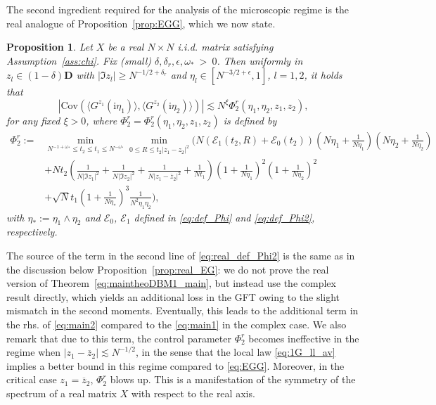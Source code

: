 \documentclass[10pt]{amsart}
\newtheorem{proposition}[theorem]{Proposition}
\numberwithin{equation}{section}
\newcommand{\ii}{\mathrm{i}}
\begin{document}
The second ingredient required for the analysis of the microscopic regime is the real analogue of Proposition~\ref{prop:EGG}, which we now state.

\begin{proposition}\label{prop:real_EGG} Let $X$ be a real $N\times N$ i.i.d. matrix satisfying Assumption~\ref{ass:chi}. Fix (small) $\delta,\delta_r,\epsilon, \omega_*~\!>~\!0$. Then uniformly in $z_l\in (1-\delta)\mathbf{D}$ with $|\Im z_l|\ge N^{-1/2+\delta_r}$ and $\eta_l\in[ N^{-3/2+\epsilon},1]$, $l=1,2$, it holds that
\begin{equation}
\left\vert\mathrm{Cov}(\langle G^{z_1}(\ii\eta_1)\rangle,\langle G^{z_2}(\ii\eta_2)\rangle)\right\vert \lesssim N^\xi \Phi_2^r(\eta_1,\eta_2,z_1,z_2), 
\label{eq:real_EGG}
\end{equation}
for any fixed $\xi>0$, where $\Phi_2^r=\Phi_2^r(\eta_1,\eta_2,z_1,z_2)$ is defined by
\begin{equation}
\begin{split}
\Phi_2^r:=&\min_{N^{-1+\omega_*}\le t_2\le t_1\le N^{-\omega_*}}\min_{0\le R\le t_2|z_1-z_2|^2}\bigg( N\left(\mathcal{E}_1(t_2,R)+\mathcal{E}_0(t_2)\right)\left(N\eta_1+\frac{1}{N\eta_1}\right)\left(N\eta_2+\frac{1}{N\eta_2}\right)\\
&+ Nt_2 \left(\frac{1}{N|\Im z_1|^2}+\frac{1}{N|\Im z_2|^2}+\frac{1}{N|z_1-\overline{z}_2|^2}+\frac{1}{Nt_1}\right)\left(1+\frac{1}{N\eta_1}\right)^2\left(1+\frac{1}{N\eta_2}\right)^2\\
&+\sqrt{N}t_1 \left(1+\frac{1}{N\eta_*}\right)^3 \frac{1}{N^2\eta_1\eta_2}\bigg),
\end{split}
\label{eq:real_def_Phi2}
\end{equation}
with $\eta_*:=\eta_1\wedge\eta_2$ and $\mathcal{E}_0$, $\mathcal{E}_1$ defined in \eqref{eq:def_Phi} and \eqref{eq:def_Phi2}, respectively.
\end{proposition}

The source of the term in the second line of \eqref{eq:real_def_Phi2} is the same as in the discussion below Proposition~\ref{prop:real_EG}: we do not prove the real version of Theorem~\ref{eq:maintheoDBM1_main}, but instead use  the complex result directly, which yields an additional loss in the GFT owing to the slight mismatch in the second moments. Eventually, this leads to the additional term in the rhs. of \eqref{eq:main2} compared to the \eqref{eq:main1} in the complex case. We also remark that due to this term, the control parameter $\Phi_2^r$ becomes ineffective in the regime when $|z_1-\overline{z}_2|\lesssim N^{-1/2}$, in the sense that the local law \eqref{eq:1G_ll_av} implies a better bound in this regime compared to \eqref{eq:EGG}. Moreover, in the critical case $z_1=\overline{z}_2$, $\Phi_2^r$ blows up. This is a manifestation of the symmetry of the spectrum of a real matrix $X$ with respect to the real axis.
\end{document}

